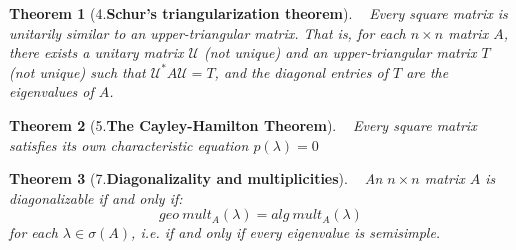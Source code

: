 \documentclass[10.5pt]{article}
\newtheorem{theo}{Theorem}
\newenvironment{definition}[2][Definition]{\begin{trivlist}
\item[\hskip \labelsep {\bfseries #1}\hskip \labelsep {\bfseries #2.}]}{\end{trivlist}}
\begin{document}
\begin{theo}[4.\textbf{Schur’s triangularization theorem}]
~ Every square matrix is unitarily similar to an upper-triangular matrix. That is, for each $n\times n$ matrix $A$, there exists a unitary matrix $\mathcal{U}$ (not unique) and an upper-triangular matrix $T$ (not unique) such that $\mathcal{U}^*A\mathcal{U} = T$, and the diagonal entries of $T$ are the eigenvalues of $A$.
\end{theo}

\begin{theo}[5.\textbf{The Cayley-Hamilton Theorem}]
~ Every square matrix satisfies its own characteristic equation $p(\lambda )=0$
\end{theo}


\begin{theo}[7.\textbf{Diagonalizality and multiplicities}]
~ An $n\times n$ matrix $A$ is diagonalizable if and only if:
$$geo\ mult_{A}(\lambda )=alg\ mult_{A}(\lambda )$$
for each $\lambda \in \sigma (A)$, i.e. if and only if every eigenvalue is semisimple.
\end{theo}
\end{document}
